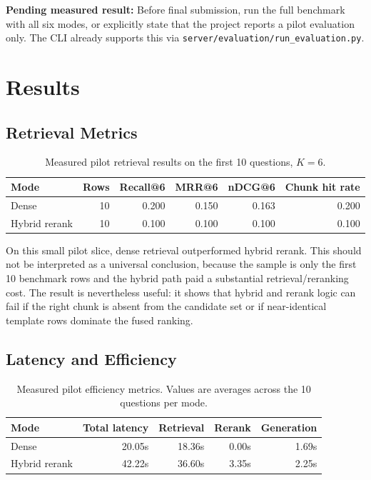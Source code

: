 \documentclass[11pt]{article}
\newcommand{\todoresult}[1]{%
  \par\noindent\colorbox{orange!14}{%
    \parbox{0.965\linewidth}{\textbf{\textcolor{todocolor}{Pending measured result:}} #1}}%
  \par\vspace{0.55em}}
\begin{document}
\todoresult{Before final submission, run the full benchmark with all six modes, or explicitly state that the project reports a pilot evaluation only. The CLI already supports this via \texttt{server/evaluation/run\_evaluation.py}.}

\section{Results}
\subsection{Retrieval Metrics}


\begin{table}[H]
\centering
\caption{Measured pilot retrieval results on the first 10 questions, $K=6$.}
\label{tab:retrieval-results}
\begin{tabular}{lrrrrr}
\toprule
Mode & Rows & Recall@6 & MRR@6 & nDCG@6 & Chunk hit rate \\
\midrule
Dense & 10 & 0.200 & 0.150 & 0.163 & 0.200 \\
Hybrid rerank & 10 & 0.100 & 0.100 & 0.100 & 0.100 \\
\bottomrule
\end{tabular}
\end{table}

On this small pilot slice, dense retrieval outperformed hybrid rerank. This should not be interpreted as a universal conclusion, because the sample is only the first 10 benchmark rows and the hybrid path paid a substantial retrieval/reranking cost. The result is nevertheless useful: it shows that hybrid and rerank logic can fail if the right chunk is absent from the candidate set or if near-identical template rows dominate the fused ranking.

\subsection{Latency and Efficiency}


\begin{table}[H]
\centering
\caption{Measured pilot efficiency metrics. Values are averages across the 10 questions per mode.}
\label{tab:efficiency-results}
\begin{tabular}{lrrrr}
\toprule
Mode & Total latency & Retrieval & Rerank & Generation \\
\midrule
Dense & 20.05s & 18.36s & 0.00s & 1.69s \\
Hybrid rerank & 42.22s & 36.60s & 3.35s & 2.25s \\
\bottomrule
\end{tabular}
\end{table}
\end{document}
